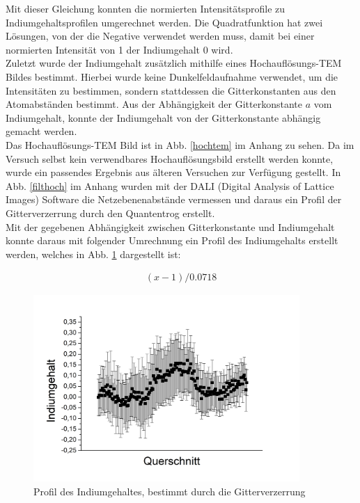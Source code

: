 \documentclass[a4paper,11pt,DIV=11]{scrartcl}
\begin{document}
Mit dieser Gleichung konnten die normierten Intensitätsprofile zu Indiumgehaltsprofilen umgerechnet werden. Die Quadratfunktion hat zwei Lösungen, von der die Negative verwendet werden muss, damit bei einer normierten Intensität von 1 der Indiumgehalt 0 wird. \\
Zuletzt wurde der Indiumgehalt zusätzlich mithilfe eines Hochauflösungs-TEM Bildes bestimmt. Hierbei wurde keine Dunkelfeldaufnahme verwendet, um die Intensitäten zu bestimmen, sondern stattdessen die Gitterkonstanten aus den Atomabständen bestimmt. Aus der Abhängigkeit der Gitterkonstante $a$ vom Indiumgehalt, konnte der Indiumgehalt von der Gitterkonstante abhängig gemacht werden. \\
Das Hochauflösungs-TEM Bild ist in Abb. \ref{hochtem} im Anhang zu sehen. Da im Versuch selbst kein verwendbares Hochauflösungsbild erstellt werden konnte, wurde ein passendes Ergebnis aus älteren Versuchen zur Verfügung gestellt. In Abb. \ref{filthoch} im Anhang wurden mit der DALI (Digital Analysis of Lattice Images) Software die Netzebenenabstände vermessen und daraus ein Profil der Gitterverzerrung durch den Quantentrog erstellt. \\
Mit der gegebenen Abhängigkeit zwischen Gitterkonstante und Indiumgehalt konnte daraus mit folgender Umrechnung ein Profil des Indiumgehalts erstellt werden, welches in Abb. \ref{hochindium} dargestellt ist:

\begin{align*}
	(x-1) / 0.0718
\end{align*}

\begin{figure}[H]\centering
	\includegraphics[width=0.9\textwidth]{Versuchsdaten/13/Graph01.png}
\caption{Profil des Indiumgehaltes, bestimmt durch die Gitterverzerrung}
\label{hochindium}
\end{figure}
\end{document}
